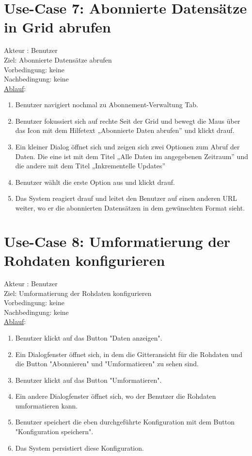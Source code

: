 \documentclass[a4paper,12pt]{scrreprt}
\begin{document}
\section*{\small \textbf{Use-Case 7: Abonnierte Datensätze in Grid abrufen}}
Akteur : Benutzer\\
Ziel: Abonnierte Datensätze abrufen\\
Vorbedingung: keine\\
Nachbedingung: keine\\
\underline{Ablauf}:
\begin{enumerate}
	\item Benutzer navigiert nochmal zu Abonnement-Verwaltung Tab. 
	\item Benutzer fokussiert sich auf rechte Seit der Grid und bewegt die Maus über das Icon mit dem Hilfetext „Abonnierte Daten abrufen” und klickt drauf.
	\item Ein kleiner Dialog öffnet sich und zeigen sich zwei Optionen zum Abruf der Daten. Die eine ist mit dem Titel „Alle Daten im angegebenen Zeitraum” und die andere mit dem Titel „Inkrementelle Updates”
	\item Benutzer wählt die erste Option aus und klickt drauf.
	\item Das System reagiert drauf und leitet den Benutzer auf einen anderen URL weiter, wo er die abonnierten Datensätzen in dem gewünschten Format sieht. 
\end{enumerate}

\section*{\small \textbf{Use-Case 8: Umformatierung der Rohdaten konfigurieren}}
Akteur : Benutzer\\
Ziel: Umformatierung der Rohdaten konfigurieren\\
Vorbedingung: keine\\
Nachbedingung: keine\\
\underline{Ablauf}:
\begin{enumerate}
	\item Benutzer klickt auf das Button "Daten anzeigen".
	\item Ein Dialogfenster öffnet sich, in dem die Gitteransicht für die Rohdaten und die Button "Abonnieren" und "Umformatieren" zu sehen sind.
	\item Benutzer klickt auf das Button "Umformatieren".
	\item Ein andere Dialogfenster öffnet sich, wo der Benutzer die Rohdaten umformatieren kann.
	\item Benutzer speichert die eben durchgeführte Konfiguration mit dem Button "Konfiguration speichern".
	\item Das System persistiert diese Konfiguration.  
\end{enumerate}
	
\end{document}
